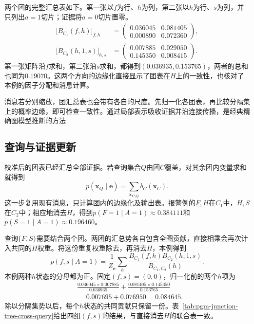 两个团的完整汇总表如下。第一张以$f$为行、$h$为列，第二张以$h$为行、$s$为列，并只列出$a=1$切片；证据将$a=0$切片置零。
\begin{equation}
  \begin{aligned}
    \bigl[B_{C_1}(f,h)\bigr]_{f,h}
      &=\begin{pmatrix}
          0.036045&0.081405\\
          0.000890&0.072360
        \end{pmatrix},\\
    \bigl[B_{C_2}(h,1,s)\bigr]_{h,s}
      &=\begin{pmatrix}
          0.007885&0.029050\\
          0.145350&0.008415
        \end{pmatrix}.
  \end{aligned}
  \label{eq:pgm-junction-tree-device-calibrated-tables}
\end{equation}
第一张矩阵沿$f$求和，第二张沿$s$求和，都得到$(0.036935,0.153765)$，两者的总和也同为$0.19070$。这两个方向的边缘化直接显示了团表在$H$上的一致性，也核对了本例的因子分配和消息计算。

消息若分别缩放，团汇总表也会带有各自的尺度。先归一化各团表，再比较分隔集上的概率边缘，即可检查一致性。通过局部表示吸收证据并沿连接传播，是经典精确图模型推断的方法

\subsection{查询与证据更新}
\label{sec:pgm-junction-tree-queries-updates}

校准后的团表已经汇总全部证据。若查询集合$Q$由团$C$覆盖，对其余团内变量求和就得到
\begin{equation}
  p(\bm{x}_Q\mid\bm{e})
    =\sum_{\bm{x}_{C\setminus Q}}b_C(\bm{x}_C).
  \label{eq:pgm-junction-tree-covered-query}
\end{equation}
这一步复用现有消息，只计算团内的边缘化及输出表。报警例的$F,H$在$C_1$中，$H,S$在$C_2$中；相应地消去$H$，得到$p(F=1\mid A=1)\approx0.384111$和$p(S=1\mid A=1)\approx0.196460$。

查询$\{F,S\}$需要结合两个团。两团的汇总势各自包含全图贡献，直接相乘会再次计入共同的$H$权重。将这份重复权重除去，再消去$H$，本例得到
\begin{equation}
  p(f,s\mid A=1)
    =\frac{1}{Z_{\bm{e}}}
      \sum_h
       \frac{B_{C_1}(f,h)B_{C_2}(h,1,s)}
            {B_{C_1,C_2}(h)}.
  \label{eq:pgm-junction-tree-cross-clique-device}
\end{equation}
本例两种$h$状态的分母都为正。固定$(f,s)=(0,0)$，归一化前的两个$h$项为
\[
  \begin{aligned}
    &\frac{0.036045\times0.007885}{0.036935}
     +\frac{0.081405\times0.145350}{0.153765}\\
    &=0.007695+0.076950=0.084645.
  \end{aligned}
\]
除以分隔集势以后，每个$h$状态的共同贡献只保留一份。表~\ref{tab:pgm-junction-tree-cross-query}给出四组$(f,s)$的结果，与直接消去$H$的联合表一致。

